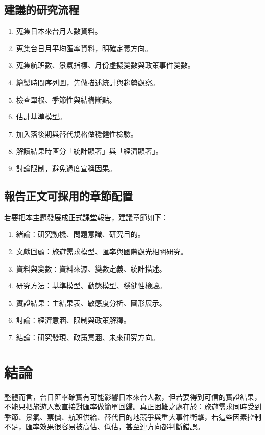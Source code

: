 \documentclass[12pt,a4paper,fontset=none]{ctexart}
\begin{document}
\subsection{建議的研究流程}

\begin{enumerate}
  \item 蒐集日本來台月人數資料。
  \item 蒐集台日月平均匯率資料，明確定義方向。
  \item 蒐集航班數、景氣指標、月份虛擬變數與政策事件變數。
  \item 繪製時間序列圖，先做描述統計與趨勢觀察。
  \item 檢查單根、季節性與結構斷點。
  \item 估計基準模型。
  \item 加入落後期與替代規格做穩健性檢驗。
  \item 解讀結果時區分「統計顯著」與「經濟顯著」。
  \item 討論限制，避免過度宣稱因果。
\end{enumerate}

\subsection{報告正文可採用的章節配置}

若要把本主題發展成正式課堂報告，建議章節如下：

\begin{enumerate}
  \item 緒論：研究動機、問題意識、研究目的。
  \item 文獻回顧：旅遊需求模型、匯率與國際觀光相關研究。
  \item 資料與變數：資料來源、變數定義、統計描述。
  \item 研究方法：基準模型、動態模型、穩健性檢驗。
  \item 實證結果：主結果表、敏感度分析、圖形展示。
  \item 討論：經濟意涵、限制與政策解釋。
  \item 結論：研究發現、政策意涵、未來研究方向。
\end{enumerate}

\section{結論}

整體而言，台日匯率確實有可能影響日本來台人數，但若要得到可信的實證結果，不能只把旅遊人數直接對匯率做簡單回歸。真正困難之處在於：旅遊需求同時受到季節、景氣、票價、航班供給、替代目的地競爭與重大事件衝擊，若這些因素控制不足，匯率效果很容易被高估、低估，甚至連方向都判斷錯誤。
\end{document}
